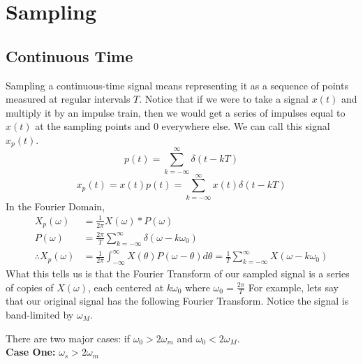 \documentclass{article}
\begin{document}
\section{Sampling}
\subsection{Continuous Time}
Sampling a continuous-time signal means representing it as a sequence of points measured at regular intervals $T$.
Notice that if we were to take a signal $x(t)$ and multiply it by an impulse train, then we would get a series of impulses
equal to $x(t)$ at the sampling points and $0$ everywhere else. We can call this signal $x_p(t)$.
$$p(t) = \sum_{k=-\infty}^{\infty}{\delta(t-kT)}$$
$$x_p(t) = x(t)p(t) = \sum_{k=-\infty}^{\infty}{x(t)\delta(t-kT)}$$
In the Fourier Domain,
\begin{align*}
    X_p(\omega) &= \frac{1}{2\pi}X(\omega)*P(\omega)\\
    P(\omega) &= \frac{2\pi}{T}\sum_{k=-\infty}^{\infty}{\delta(\omega-k\omega_0)}\\
    \therefore X_p(\omega) &= \frac{1}{2\pi}\int_{-\infty}^{\infty}{X(\theta)P(\omega-\theta)d\theta} = \frac{1}{T}\sum_{k=-\infty}^{\infty}{X(\omega-k\omega_0)}
\end{align*}
What this tells us is that the Fourier Transform of our sampled signal is a series of copies of $X(\omega)$, each centered
at $k\omega_0$ where $\omega_0 = \frac{2\pi}{T}$
For example, lets say that our original signal has the following Fourier Transform. Notice the signal is band-limited by $\omega_M$.
\begin{figure}[H]
    \centering
\end{figure}
There are two major cases: if $\omega_0 > 2\omega_m$ and $\omega_0 < 2\omega_M$.\\
\textbf{Case One: }$\omega_s > 2\omega_m$
\end{document}
